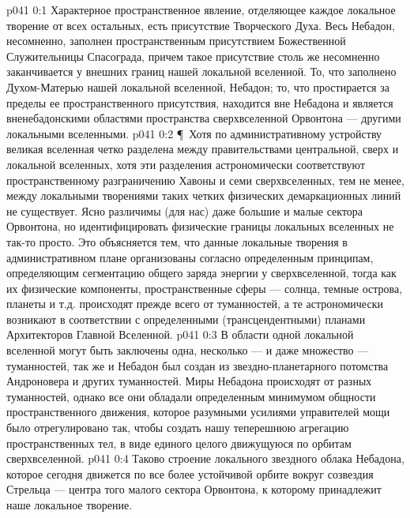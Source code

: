 \vs p041 0:1 Характерное пространственное явление, отделяющее каждое локальное творение от всех остальных, есть присутствие Творческого Духа. Весь Небадон, несомненно, заполнен пространственным присутствием Божественной Служительницы Спасограда, причем такое присутствие столь же несомненно заканчивается у внешних границ нашей локальной вселенной. То, что заполнено Духом\hyp{}Матерью нашей локальной вселенной,  Небадон; то, что простирается за пределы ее пространственного присутствия, находится вне Небадона и является вненебадонскими областями пространства сверхвселенной Орвонтона --- другими локальными вселенными.
\vs p041 0:2 \P\ Хотя по административному устройству великая вселенная четко разделена между правительствами центральной, сверх и локальной вселенных, хотя эти разделения астрономически соответствуют пространственному разграничению Хавоны и семи сверхвселенных, тем не менее, между локальными творениями таких четких физических демаркационных линий не существует. Ясно различимы (для нас) даже большие и малые сектора Орвонтона, но идентифицировать физические границы локальных вселенных не так\hyp{}то просто. Это объясняется тем, что данные локальные творения в административном плане организованы согласно определенным  принципам, определяющим сегментацию общего заряда энергии у сверхвселенной, тогда как их физические компоненты, пространственные сферы --- солнца, темные острова, планеты и т.д. происходят прежде всего от туманностей, а те астрономически возникают в соответствии с определенными  (трансцендентными) планами Архитекторов Главной Вселенной.
\vs p041 0:3 В области одной локальной вселенной могут быть заключены одна, несколько --- и даже множество --- туманностей, так же и Небадон был создан из звездно\hyp{}планетарного потомства Андроновера и других туманностей. Миры Небадона происходят от разных туманностей, однако все они обладали определенным минимумом общности пространственного движения, которое разумными усилиями управителей мощи было отрегулировано так, чтобы создать нашу теперешнюю агрегацию пространственных тел, в виде единого целого движущуюся по орбитам сверхвселенной.
\vs p041 0:4 Таково строение локального звездного облака Небадона, которое сегодня движется по все более устойчивой орбите вокруг созвездия Стрельца --- центра того малого сектора Орвонтона, к которому принадлежит наше локальное творение.
